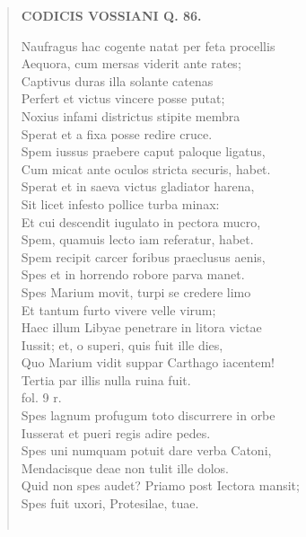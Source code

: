 \documentclass[11pt, a4paper]{report}
\begin{document}
\begin{verse}
    \begin{center} \textbf{CODICIS VOSSIANI Q. 86.} \end{center} \marginpar{[201]} Naufragus hac cogente natat per feta procellis \\ Aequora, cum mersas viderit ante rates; \\ Captivus duras illa solante catenas \\ Perfert et victus vincere posse putat; \\ Noxius infami districtus stipite membra \\ Sperat et a fixa posse redire cruce. \\ Spem iussus praebere caput paloque ligatus, \\ Cum micat ante oculos stricta securis, habet. \\ Sperat et in saeva victus gladiator harena, \\ Sit licet infesto pollice turba minax: \\ Et cui descendit iugulato in pectora mucro, \\ Spem, quamuis lecto iam referatur, habet. \\ Spem recipit carcer foribus praeclusus aenis, \\ Spes et in horrendo robore parva manet. \\ Spes Marium movit, turpi se credere limo \\ Et tantum furto vivere velle virum; \\ Haec illum Libyae penetrare in litora victae \\ Iussit; et, o superi, quis fuit ille dies, \\ Quo Marium vidit suppar Carthago iacentem! \\ Tertia par illis nulla ruina fuit. \\ fol. 9 r. \\ Spes lagnum profugum toto discurrere in orbe \\ Iusserat et pueri regis adire pedes. \\ Spes uni numquam potuit dare verba Catoni, \\ Mendacisque deae non tulit ille dolos. \\ Quid non spes audet? Priamo post Iectora mansit; \\ Spes fuit uxori, Protesilae, tuae. \\ 
        ﻿\pagebreak 

\end{verse}
\end{document}
